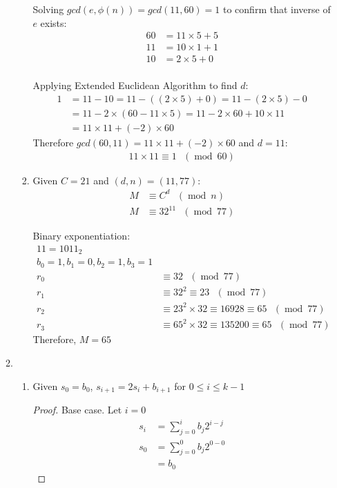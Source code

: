 \documentclass[11pt]{article}
\theoremstyle{definition}
\renewcommand{\pmod}[1]{\mbox{\ $(\ensuremath{\operatorname{mod}}\ {#1})$}}
\begin{document}
\begin{enumerate}
\begin{enumerate}
\begin{enumerate}
        Solving $gcd(e, \phi{(n)}) = gcd(11, 60) = 1$ to confirm that inverse of $e$ exists:
        \begin{align*}
          60 &= 11 \times 5 + 5 \\
          11 &= 10 \times 1 + 1 \\
          10 &= 2 \times 5 + 0 \\
        \end{align*}

        Applying Extended Euclidean Algorithm to find $d$:
        \begin{align*}
          1 &= 11 - 10 = 11 - ((2 \times 5) + 0) = 11 - (2 \times 5) - 0 \\
            &= 11 - 2 \times (60 - 11 \times 5) = 11 - 2 \times 60 + 10 \times 11 \\
            &= 11 \times 11 + (-2) \times 60
        \end{align*}
        Therefore $gcd(60, 11) = 11 \times 11 + (-2) \times 60$ and $d = 11$:
        \begin{align*}
          11 \times 11 \equiv 1 \pmod{60}
        \end{align*}
      \item
        Given $C = 21$ and $(d, n) = (11, 77)$:
        \begin{align*}
          M &\equiv C^d \pmod{n} \\
          M &\equiv 32^{11} \pmod{77}
        \end{align*}

        Binary exponentiation:
        \begin{align*}
          11 = 1011_{2} \\
          b_0 = 1, b_1 = 0, b_2 = 1, b_3 = 1 \\
          r_0 &\equiv 32 \pmod{77} \\
          r_1 &\equiv 32^2 \equiv 23 \pmod{77} \\
          r_2 &\equiv 23^2 \times 32 \equiv 16928 \equiv 65 \pmod{77} \\
          r_3 &\equiv 65^2 \times 32 \equiv 135200 \equiv 65 \pmod{77}
        \end{align*}
        Therefore, $M = 65$
    \end{enumerate}
  \item
    \begin{enumerate}
      \item
        Given $s_0 = b_0$, $s_{i + 1} = 2s_i + b_{i + 1}$ for $0 \leq i \leq k - 1$
        \begin{proof}
          Base case. Let $i = 0$
          \begin{align*}
            s_i &= \sum^{i}_{j = 0} b_j 2^{i - j} \\
            s_0 &= \sum^{0}_{j = 0} b_j2^{0 - 0} \\
                &= b_0
          \end{align*}


\end{proof}
\end{enumerate}
\end{enumerate}
\end{enumerate}
\end{document}
